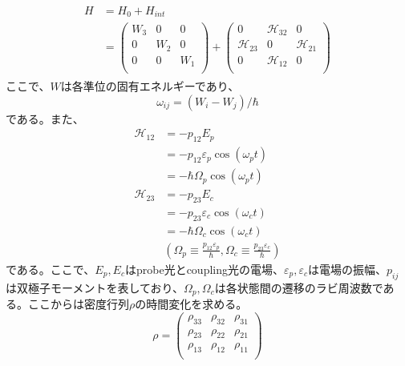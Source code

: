 \documentclass[dvipdfmx]{jsarticle}
\begin{document}
\begin{align}
\begin{split}
H &= H_0 + H_{int} \\
&= 
    \begin{pmatrix} 
        W_3 & 0 & 0 \\
        0 & W_2 & 0 \\
        0 & 0 & W_1 \\
    \end{pmatrix}
    +
    \begin{pmatrix} 
        0 & \mathcal{H}_{32} & 0 \\
        \mathcal{H}_{23} & 0 & \mathcal{H}_{21} \\
        0 & \mathcal{H}_{12} & 0 \\
    \end{pmatrix}
\end{split}
\end{align}
ここで、$W$は各準位の固有エネルギーであり、
\begin{equation}
    \omega_{ij} = (W_i - W_j) / \hbar
\end{equation}
である。また、
\begin{equation}
\begin{split}
\mathcal{H}_{12} &= -p_{12}E_p\\
&= -p_{12} \varepsilon_p \cos{(\omega_p t)} \\
&= -\hbar \Omega_p \cos{(\omega_p t)} \\
\mathcal{H}_{23} &= -p_{23}E_c \\
&= -p_{23} \varepsilon_c \cos{(\omega_c t)} \\
&= -\hbar \Omega_c \cos{(\omega_c t)} \\
&\left( \Omega_p \equiv \frac{p_{12}\varepsilon_p}{\hbar} , \Omega_c \equiv \frac{p_{23}\varepsilon_c}{\hbar} \right) 
\end{split}
\end{equation}
である。ここで、$E_p, E_c$はprobe光とcoupling光の電場、$\varepsilon_p, \varepsilon_c$は電場の振幅、$p_{ij}$は双極子モーメントを表しており、$\Omega_p, \Omega_c$は各状態間の遷移のラビ周波数である。ここからは密度行列$\rho$の時間変化を求める。
\begin{equation}
\rho = 
\begin{pmatrix} 
        \rho_{33} & \rho_{32} & \rho_{31} \\
        \rho_{23} & \rho_{22} & \rho_{21} \\
        \rho_{13} & \rho_{12} & \rho_{11} \\
\end{pmatrix}
\end{equation}
\end{document}
